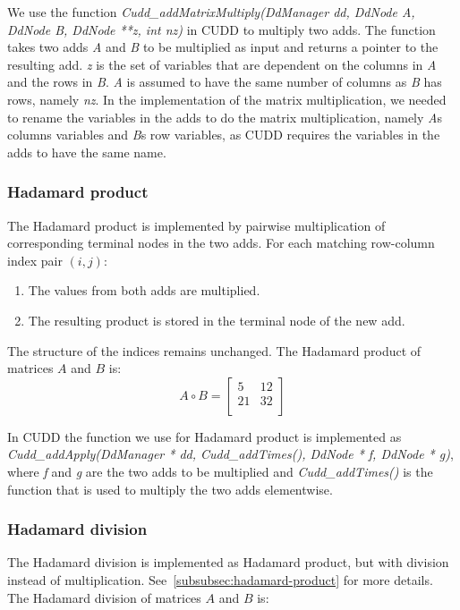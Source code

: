 We use the function \textit{Cudd\_addMatrixMultiply(DdManager dd, DdNode A, DdNode B, DdNode **z, int nz)} in CUDD to multiply two \glspl{add}. 
The function takes two \glspl{add} \textit{A} and \textit{B} to be multiplied as input and returns a pointer to the resulting \gls{add}.
\textit{z} is the set of variables that are dependent on the columns in \textit{A} and the rows in \textit{B}.
\textit{A} is assumed to have the same number of columns as \textit{B} has rows, namely \textit{nz}.
In the implementation of the matrix multiplication, we needed to rename the variables in the \glspl{add} to do the matrix multiplication, namely \textit{A}s columns variables and \textit{B}s row variables, as CUDD requires the variables in the \glspl{add} to have the same name.

\subsubsection{Hadamard product}\label{subsubsec:hadamard-product}
The Hadamard product is implemented by pairwise multiplication of corresponding terminal nodes in the two \glspl{add}. For each matching row-column index pair $(i, j)$:
\begin{enumerate}
    \item The values from both \glspl{add} are multiplied.
    \item The resulting product is stored in the terminal node of the new \gls{add}.
\end{enumerate}
The structure of the indices remains unchanged.
The Hadamard product of matrices $A$ and $B$ is:
\[
    A \circ B = \begin{bmatrix}
        5  & 12 \\
        21 & 32 \\
    \end{bmatrix}
\]

In CUDD the function we use for Hadamard product is implemented as \textit{Cudd\_addApply(DdManager * dd, Cudd\_addTimes(), DdNode * f, DdNode * g)}, where \textit{f} and \textit{g} are the two \glspl{add} to be multiplied and \textit{Cudd\_addTimes()} is the function that is used to multiply the two \glspl{add} elementwise.

\subsubsection{Hadamard division}
The Hadamard division is implemented as Hadamard product, but with division instead of multiplication. See~\autoref{subsubsec:hadamard-product} for more details.
The Hadamard division of matrices $A$ and $B$ is:

